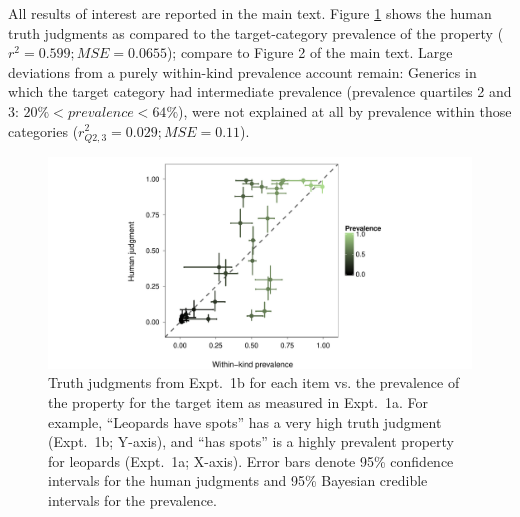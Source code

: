 \documentclass[10pt,letterpaper]{article}
\begin{document}
All results of interest are reported in the main text.
 Figure \ref{fig:scatterprev} shows the human truth judgments as compared to the target-category prevalence of the property ($r^2 = 0.599; MSE = 0.0655$); compare to Figure 2 of the main text.
 Large deviations from a purely within-kind prevalence account remain: 
 Generics in which the target category had intermediate prevalence (prevalence quartiles 2 and 3: $ 20\% < prevalence < 64\%$), were not explained at all by prevalence within those categories ($r_{Q2,3}^2 = 0.029; MSE = 0.11$).


%


\begin{figure}
\centering
    \includegraphics[width=\columnwidth]{tj_n100_tjVsPrevalence_95hdi-colorPrev.pdf}
    \caption{Truth judgments from Expt.~1b for each item vs. the prevalence of the property for the target item as measured in Expt.~1a. For example, ``Leopards have spots'' has a very high truth judgment (Expt.~1b; Y-axis), and ``has spots'' is a highly prevalent property for leopards (Expt.~1a; X-axis). Error bars denote 95\% confidence intervals for the human judgments and 95\% Bayesian credible intervals for the prevalence.
    }
  \label{fig:scatterprev}
\end{figure}
\end{document}
